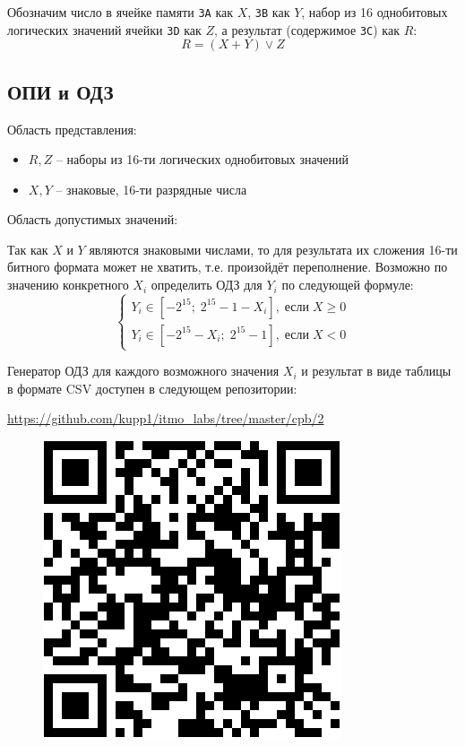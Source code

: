 \documentclass[11pt,a4paper]{article}
\begin{document}
Обозначим число в ячейке памяти \texttt{3A} как $X$, \texttt{3B} как $Y$, набор из 16 однобитовых логических значений ячейки \texttt{3D} как $Z$, а результат (содержимое \texttt{3С}) как $R$:
\begin{equation}
R = (X + Y) \lor Z
\end{equation}
\subsection{ОПИ и ОДЗ}
Область представления:
\begin{itemize}
	\item $R, Z$ -- наборы из 16-ти логических однобитовых значений
	\item $X, Y$ --	 знаковые, 16-ти разрядные числа
\end{itemize}

Область допустимых значений:

Так как $X$ и $Y$ являются знаковыми числами, то для результата их сложения 16-ти битного формата может не хватить, т.е. произойдёт переполнение. Возможно по значению конкретного $X_i$ определить ОДЗ для $Y_i$ по следующей формуле:
\begin{equation}
\begin{cases}
Y_i \in [-2^{15}; \;2^{15} - 1 - X_i], \; \text{если} \; X \geqslant 0\\
Y_i \in [-2^{15} - X_i;\; 2^{15} - 1], \; \text{если} \; X < 0
\end{cases}
\end{equation}

Генератор ОДЗ для каждого возможного значения $X_i$ и результат в виде таблицы в формате CSV доступен в следующем репозитории:\\
\begin{center}
\href{https://github.com/kupp1/itmo_labs/tree/master/cpb/2}{https://github.com/kupp1/itmo\_labs/tree/master/cpb/2}
\end{center} 
\begin{figure}[H]
	\centering
	\includegraphics[scale=0.3]{../link.png}
\end{figure}
\end{document}

